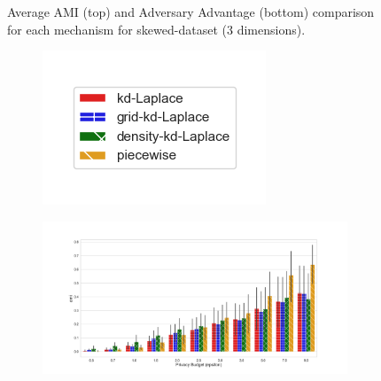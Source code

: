 \begin{figure}[H]
\begin{subfigure}{1\textwidth}
      \end{subfigure}
      \caption{Average AMI (top) and Adversary Advantage (bottom) comparison for each mechanism for skewed-dataset (3 dimensions).}
      \label{fig:utility_skewed-dataset_comparison_nd_plot}
\end{figure}
\newpage



\begin{figure}[H]
      \centering
      \begin{subfigure}{0.30\textwidth}
            \includegraphics[width=\textwidth]{Results/kd-laplace/ami_bar_comparison_legend.png}
      \end{subfigure}
      \begin{subfigure}{1\textwidth}
            \includegraphics[width=1\textwidth]{Results/kd-laplace/ami_line-dataset_comparison.png}
      \end{subfigure}
      \begin{subfigure}{1\textwidth}

\end{subfigure}
\end{figure}
